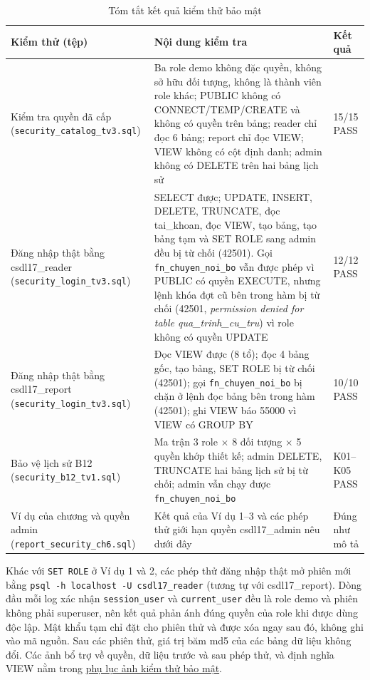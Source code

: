 \begin{table}[H]
\centering
\fontsize{11pt}{14pt}\selectfont
\renewcommand{\arraystretch}{1.15}
\begin{tabularx}{\textwidth}{|P{3.6cm}|Y|P{2.1cm}|}
\hline
\textbf{Kiểm thử (tệp)} & \textbf{Nội dung kiểm tra} & \textbf{Kết quả} \\
\hline
Kiểm tra quyền đã cấp (\texttt{security\_catalog\_tv3.sql}) & Ba role demo không đặc quyền, không sở hữu đối tượng, không là thành viên role khác; PUBLIC không có CONNECT/TEMP/CREATE và không có quyền trên bảng; reader chỉ đọc 6 bảng; report chỉ đọc VIEW; VIEW không có cột định danh; admin không có DELETE trên hai bảng lịch sử & 15/15 PASS \\
\hline
Đăng nhập thật bằng csdl17\_reader (\texttt{security\_login\_tv3.sql}) & SELECT được; UPDATE, INSERT, DELETE, TRUNCATE, đọc tai\_khoan, đọc VIEW, tạo bảng, tạo bảng tạm và SET ROLE sang admin đều bị từ chối (42501). Gọi \texttt{fn\_chuyen\_noi\_bo} vẫn được phép vì PUBLIC có quyền EXECUTE, nhưng lệnh khóa đợt cũ bên trong hàm bị từ chối (42501, \textit{permission denied for table qua\_trinh\_cu\_tru}) vì role không có quyền UPDATE & 12/12 PASS \\
\hline
Đăng nhập thật bằng csdl17\_report (\texttt{security\_login\_tv3.sql}) & Đọc VIEW được (8 tổ); đọc 4 bảng gốc, tạo bảng, SET ROLE bị từ chối (42501); gọi \texttt{fn\_chuyen\_noi\_bo} bị chặn ở lệnh đọc bảng bên trong hàm (42501); ghi VIEW báo 55000 vì VIEW có GROUP BY & 10/10 PASS \\
\hline
Bảo vệ lịch sử B12 (\texttt{security\_b12\_tv1.sql}) & Ma trận 3 role $\times$ 8 đối tượng $\times$ 5 quyền khớp thiết kế; admin DELETE, TRUNCATE hai bảng lịch sử bị từ chối; admin vẫn chạy được \texttt{fn\_chuyen\_noi\_bo} & K01--K05 PASS \\
\hline
Ví dụ của chương và quyền admin (\texttt{report\_security\_ch6.sql}) & Kết quả của Ví dụ 1--3 và các phép thử giới hạn quyền csdl17\_admin nêu dưới đây & Đúng như mô tả \\
\hline
\end{tabularx}
\caption{Tóm tắt kết quả kiểm thử bảo mật}
\label{tab:ketquabaomat}
\end{table}

Khác với \texttt{SET ROLE} ở Ví dụ 1 và 2, các phép thử đăng nhập thật mở phiên mới bằng \texttt{psql -h localhost -U csdl17\_reader} (tương tự với csdl17\_report). Dòng đầu mỗi log xác nhận \texttt{session\_user} và \texttt{current\_user} đều là role demo và phiên không phải superuser, nên kết quả phản ánh đúng quyền của role khi được dùng độc lập. Mật khẩu tạm chỉ đặt cho phiên thử và được xóa ngay sau đó, không ghi vào mã nguồn. Sau các phiên thử, giá trị băm md5 của các bảng dữ liệu không đổi. Các ảnh bổ trợ về quyền, dữ liệu trước và sau phép thử, và định nghĩa VIEW nằm trong \hyperref[sec:anh-sec]{phụ lục ảnh kiểm thử bảo mật}.

